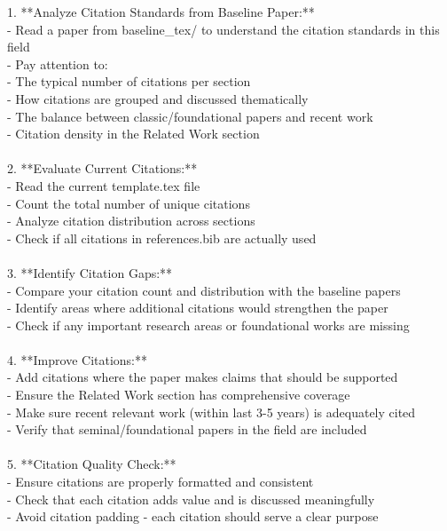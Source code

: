 \begin{tcolorbox}[colback=gray!10, colframe=gray!40!black, breakable=true, title=Prompt for Citation Validation]
1. **Analyze Citation Standards from Baseline Paper:**\\
   - Read a paper from baseline\_tex/ to understand the citation standards in this field\\
   - Pay attention to:\\
     - The typical number of citations per section\\
     - How citations are grouped and discussed thematically\\
     - The balance between classic/foundational papers and recent work\\
     - Citation density in the Related Work section\\
\\
2. **Evaluate Current Citations:**\\
   - Read the current template.tex file\\
   - Count the total number of unique citations\\
   - Analyze citation distribution across sections\\
   - Check if all citations in references.bib are actually used\\
\\
3. **Identify Citation Gaps:**\\
   - Compare your citation count and distribution with the baseline papers\\
   - Identify areas where additional citations would strengthen the paper\\
   - Check if any important research areas or foundational works are missing\\
\\
4. **Improve Citations:**\\
   - Add citations where the paper makes claims that should be supported\\
   - Ensure the Related Work section has comprehensive coverage\\
   - Make sure recent relevant work (within last 3-5 years) is adequately cited\\
   - Verify that seminal/foundational papers in the field are included\\
\\
5. **Citation Quality Check:**\\
   - Ensure citations are properly formatted and consistent\\
   - Check that each citation adds value and is discussed meaningfully\\
   - Avoid citation padding - each citation should serve a clear purpose\\

\end{tcolorbox}
